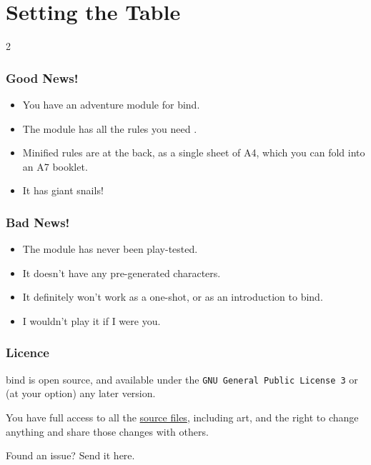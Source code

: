 \chapter{Setting the Table}


\begin{multicols}{2}

\subsection*{Good News!}

\begin{itemize}
  \item
  You have an adventure module for \gls{bind}.
  \item
  The module has all the rules you need .
  \item
  Minified rules are at the back, as a single sheet of A4, which you can fold into an A7 booklet.
  \item
  It has giant snails!
\end{itemize}

\subsection*{Bad News!}

\begin{itemize}
  \item
  The module has never been play-tested.
  \item
  It doesn't have any pre-generated characters.
  \item
  It definitely won't work as a one-shot, or as an introduction to \gls{bind}.
  \item
  I wouldn't play it if I were you.
\end{itemize}

\columnbreak

\subsection*{Licence}

\Gls{bind} is open source, and available under the {\tt GNU General Public License 3} or (at your option) any later version.

You have full access to all the \href{https://gitlab.com/bindrpg/aif}{source files}, including art, and the right to change anything and share those changes with others.

\begin{center}
  
  Found an issue?
  Send it here.
\end{center}

\end{multicols}
